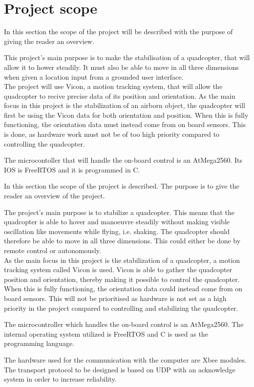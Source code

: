 \section{Project scope}

In this section the scope of the project will be described with the purpose of giving the reader an overview. \newpar

This project's main purpose is to make the stabilisation of a quadcopter, that will allow it to hower steadily. It must also be able to move in all three dimensions when given a location input from a grounded user interface. \\
The project will use Vicon, a motion tracking system, that will allow the quadcopter to recive precise data of its position and orientation. 
As the main focus in this project is the stabilization of an airborn object, the quadcopter will first be using the Vicon data for both orientation and position. When this is fully functioning, the orientation data must instead come from on board sensors. This is done, as hardware work must not be of too high priority compared to controlling the quadcopter. \newpar

The microcontoller that will handle the on-board control is an AtMega2560. Its IOS is FreeRTOS and it is programmed in C. 


In this section the scope of the project is described. The purpose is to give the reader an overview of the project. \newpar

The project's main purpose is to stabilize a quadcopter. This means that the quadcopter is able to hover and manoeuvre steadily without making visible oscillation like movements while flying, i.e. shaking. The quadcopter should therefore be able to move in all three dimensions. This could either be done by remote control or autonomously.\\

As the main focus in this project is the stabilization of a quadcopter, a motion tracking system called Vicon is used. Vicon is able to gather the quadcopter position and orientation, thereby making it possible to control the quadcopter. When this is fully functioning, the orientation data could instead come from on board sensors. This will not be prioritised as hardware is not set as a high priority in the project compared to controlling and stabilizing the quadcopter. \newpar

The microcontroller which handles the on-board control is an AtMega2560. The internal operating system utilized is FreeRTOS and C is used as the programming language.

The hardware used for the communication with the computer are Xbee modules. The transport protocol to be designed is based on UDP with an acknowledge system in order to increase reliability. 




